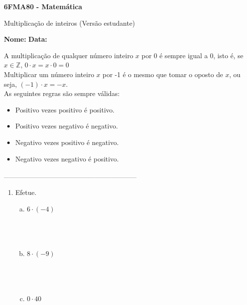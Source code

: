 \documentclass[a4paper,14pt]{article}
\begin{document}
	
	\noindent\textbf{6FMA80 - Matemática} 
	
	\begin{center}Multiplicação de inteiros (Versão estudante)
	\end{center}
	
	\noindent\textbf{Nome:} \underline{\hspace{10cm}}
	\noindent\textbf{Data:} \underline{\hspace{4cm}}
	
	
	\begin{multicols}{2}
		\noindent A multiplicação de qualquer número inteiro $x$ por 0 é sempre igual a 0, isto é, se $x \in \mathbb{Z}$, $0 \cdot x = x \cdot 0 = 0$ \\
		Multiplicar um número inteiro $x$ por -1 é o mesmo que tomar o oposto de $x$, ou seja, $(-1) \cdot x = -x$. \\
		As seguintes regras são sempre válidas: 
		\begin{itemize}
			\item Positivo vezes positivo é positivo.
			\item Positivo vezes negativo é negativo.
			\item Negativo vezes positivo é negativo.
			\item Negativo vezes negativo é positivo.
		\end{itemize}
		\noindent\textsubscript{-----------------------------------------------------------------------}
		\begin{enumerate}
			\item Efetue.
			\begin{enumerate}[a)]
				\item $6 \cdot (-4)$ \\\\\\\\
				\item $8 \cdot (-9)$ \\\\\\\\
				\item $0 \cdot 40$ \\\\\\\\

\end{enumerate}
\end{enumerate}
\end{multicols}
\end{document}
